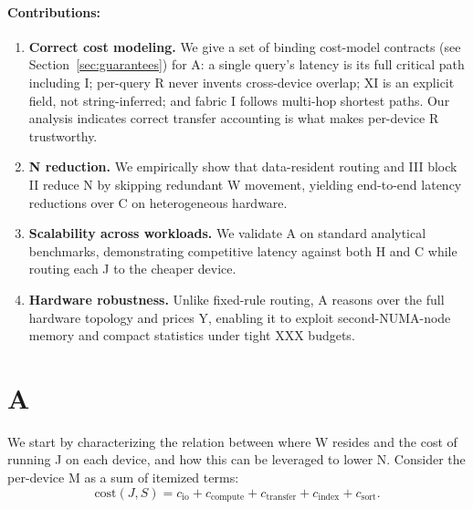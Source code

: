 \documentclass{article}
\begin{document}
\paragraph{Contributions:}
\begin{enumerate}
    \item \textbf{Correct cost modeling.} We give a set of binding cost-model
    contracts (see Section~\ref{sec:guarantees}) for A: a single query's
    latency is its full critical path including I; per-query R never invents
    cross-device overlap; XI is an explicit field, not string-inferred; and
    fabric I follows multi-hop shortest paths. Our analysis indicates correct
    transfer accounting is what makes per-device R trustworthy.

    \item \textbf{N reduction.} We empirically show that data-resident routing
    and III block II reduce N by skipping redundant W movement, yielding
    end-to-end latency reductions over C on heterogeneous hardware.

    \item \textbf{Scalability across workloads.} We validate A on
    standard analytical benchmarks, demonstrating competitive latency against
    both H and C while routing each J to the cheaper device.

    \item \textbf{Hardware robustness.} Unlike fixed-rule routing, A reasons
    over the full hardware topology and prices Y, enabling it to exploit
    second-NUMA-node memory and compact statistics under tight XXX budgets.
\end{enumerate}

\section{A}
\label{sec:lynceus}

We start by characterizing the relation between where W resides and the cost of
running J on each device, and how this can be leveraged to lower N. Consider the
per-device M as a sum of itemized terms:
\begin{equation}
\text{cost}(J, S) = c_{\text{io}} + c_{\text{compute}} + c_{\text{transfer}} + c_{\text{index}} + c_{\text{sort}}.
\end{equation}
\end{document}

